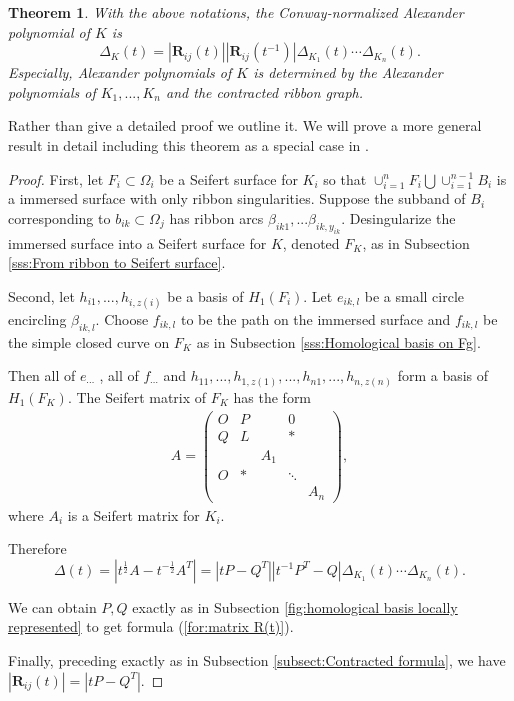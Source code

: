\documentclass{amsart}
\newtheorem{thm}{Theorem}[subsection]
\theoremstyle{definition}
\theoremstyle{remark}
\numberwithin{equation}{subsection}
\begin{document}
\begin{thm}\label{thm:generalize}
With the above notations, the Conway-normalized Alexander polynomial of $K$ is
\[
\Delta_{K}(t)=|\boldsymbol{R}_{ij}(t)||\boldsymbol{R}_{ij}(t^{-1})|\Delta_{K_{1}}(t)\cdots\Delta_{K_{n}}(t).
\]
Especially, Alexander polynomials of $K$ is determined by the Alexander polynomials of $K_{1},...,K_{n}$ and the contracted ribbon graph.
\end{thm}

Rather than give a detailed proof we outline it. We will prove a more general result in detail including this theorem as a special case in \cite{Bai2023}.

\begin{proof}
First, let $F_{i}\subset\Omega_{i}$ be a Seifert surface for $K_{i}$ so that $\cup_{i=1}^{n}F_{i}\bigcup\cup_{i=1}^{n-1}B_{i}$ is a immersed surface with only ribbon singularities. Suppose the subband of $B_{i}$ corresponding to $b_{ik}\subset\Omega_{j}$ has ribbon arcs $\beta_{ik1},...\beta_{ik,y_{ik}}$. Desingularize the immersed surface into a Seifert surface for $K$, denoted $F_{K}$, as in Subsection \ref{sss:From ribbon to Seifert surface}.

Second, let $h_{i1},...,h_{i,z(i)}$ be a basis of $H_{1}(F_{i})$. Let $e_{ik,l}$ be a small circle encircling $\beta_{ik,l}$. Choose $f_{ik,l}$ to be the path on the immersed surface and $f_{ik,l}$ be the simple closed curve on $F_{K}$ as in Subsection \ref{sss:Homological basis on Fg}.

Then all of $e_{\cdots}$ , all of $f_{\cdots}$ and $h_{11},...,h_{1,z(1)},...,h_{n1},...,h_{n,z(n)}$ form a basis of $H_{1}(F_{K})$. The Seifert matrix of $F_{K}$ has the form
\begin{align*}
A = \left(
\begin{array}{ccccc}
O & P &     & 0 &\\
Q & L &     & \ast &\\
  &   &      A_1 & & \\
O & \ast & &\ddots & \\
  &   &      & & A_n
\end{array}
\right),
\end{align*}
where $A_{i}$ is a Seifert matrix for $K_{i}$.

Therefore
\[
\Delta(t)=|t^{\frac{1}{2}}A-t^{-\frac{1}{2}}A^{T}|=|tP-Q^{T}||t^{-1}P^{T}-Q|\Delta_{K_{1}}(t)\cdots\Delta_{K_{n}}(t).
\]

We can obtain $P,Q$ exactly as in Subsection \ref{fig:homological basis locally represented} to get formula (\ref{for:matrix R(t)}).

Finally, preceding exactly as in Subsection \ref{subsect:Contracted formula}, we have $|\boldsymbol{R}_{ij}(t)|=|tP-Q^{T}|$.
\end{proof}
\end{document}
